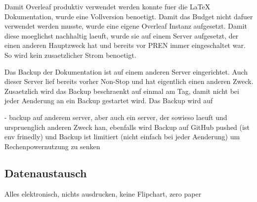 Damit Overleaf produktiv verwendet werden konnte fuer die LaTeX Dokumentation, wurde eine Vollversion benoetigt. Damit das Budget nicht dafuer verwendet werden musste, wurde eine eigene Overleaf Instanz aufgesetzt. Damit diese moeglichst nachhaltig laeuft, wurde sie auf einem Server aufgesetzt, der einen anderen Hauptzweck hat und bereits vor PREN immer eingeschaltet war. So wird kein zusaetzlicher Strom benoetigt.

Das Backup der Dokumentation ist auf einem anderen Server eingerichtet. Auch dieser Server lief bereits vorher Non-Stop und hat eigentlich einen anderen Zweck. Zusaetzlich wird das Backup beschraenkt auf einmal am Tag, damit nicht bei jeder Aenderung an ein Backup gestartet wird. Das Backup wird auf 

- backup auf anderem server, aber auch ein server, der sowieso laeuft und urspruenglich anderen Zweck han, ebenfalls wird Backup auf GitHub pushed (ist env frinedly) und Backup ist limitiert (nicht einfach bei jeder Aenderung) um Rechenpowernutzung zu senken

\subsection{Datenaustausch}

Alles elektronisch, nichts ausdrucken, keine Flipchart, zero paper